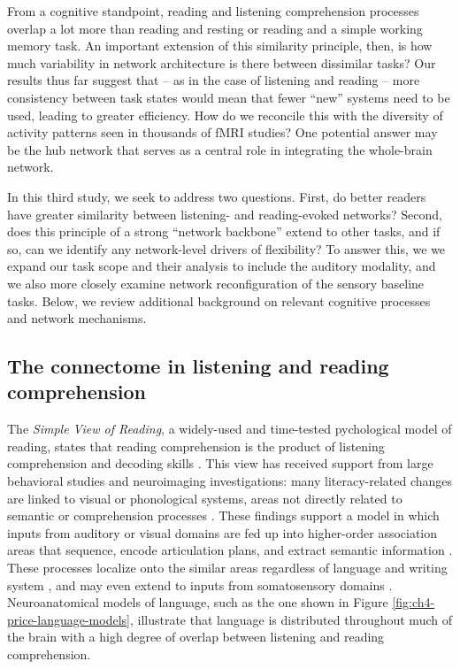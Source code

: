 From a cognitive standpoint, reading and listening comprehension processes overlap a lot more than reading and resting or reading and a simple working memory task. An important extension of this similarity principle, then, is how much variability in network architecture is there between dissimilar tasks? Our results thus far suggest that -- as in the case of listening and reading -- more consistency between task states would mean that fewer ``new'' systems need to be used, leading to greater efficiency. How do we reconcile this with the diversity of activity patterns seen in thousands of fMRI studies? One potential answer may be the hub network that serves as a central role in integrating the whole-brain network.

In this third study, we seek to address two questions. First, do better readers have greater similarity between listening- and reading-evoked networks? Second, does this principle of a strong ``network backbone'' extend to other tasks, and if so, can we identify any network-level drivers of flexibility? To answer this, we we expand our task scope and their analysis to include the auditory modality, and we also more closely examine network reconfiguration of the sensory baseline tasks. Below, we review additional background on relevant cognitive processes and network mechanisms.

\subsection{The connectome in listening and reading comprehension}

The \textit{Simple View of Reading}, a widely-used and time-tested pychological model of reading, states that reading comprehension is the product of listening comprehension and decoding skills \citep{Gough1986}. This view has received support from large behavioral studies \citep{Kirby2008} and neuroimaging investigations: many literacy-related changes are linked to visual or phonological systems, areas not directly related to semantic or comprehension processes \citep{Schlaggar2007, Dehaene2015}. These findings support a model in which inputs from auditory or visual domains are fed up into higher-order association areas that sequence, encode articulation plans, and extract semantic information \citep{Price2012}. These processes localize onto the similar areas regardless of language and writing system \citep{Rueckl2015}, and may even extend to inputs from somatosensory domains \citep{Xu2005, Sood2016}. Neuroanatomical models of language, such as the one shown in Figure \ref{fig:ch4-price-language-models}, illustrate that language is distributed throughout much of the brain with a high degree of overlap between listening and reading comprehension. 

